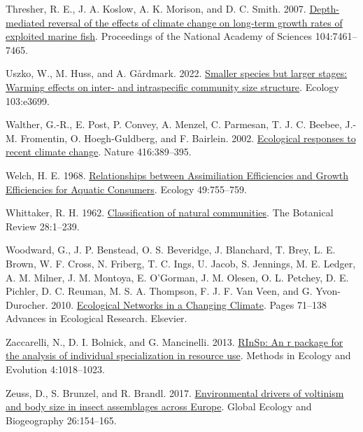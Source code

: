 \documentclass[
]{article}
\newlength{\cslhangindent}
\newlength{\cslentryspacingunit} %
\newenvironment{CSLReferences}[2] %
 {%
  \setlength{\parindent}{0pt}
  \ifodd #1
  \let\oldpar\par
  \def\par{\hangindent=\cslhangindent\oldpar}
  \fi
  \setlength{\parskip}{#2\cslentryspacingunit}
 }%
 {}
\numberwithin{equation}
\begin{document}
\begin{CSLReferences}{1}{0}
\leavevmode{}%
Thresher, R. E., J. A. Koslow, A. K. Morison, and D. C. Smith. 2007.
\href{https://doi.org/10.1073/pnas.0610546104}{Depth-mediated reversal
of the effects of climate change on long-term growth rates of exploited
marine fish}. Proceedings of the National Academy of Sciences
104:7461--7465.

\leavevmode{}%
Uszko, W., M. Huss, and A. Gårdmark. 2022.
\href{https://doi.org/10.1002/ecy.3699}{Smaller species but larger
stages: {Warming} effects on inter- and intraspecific community size
structure}. Ecology 103:e3699.

\leavevmode{}%
Walther, G.-R., E. Post, P. Convey, A. Menzel, C. Parmesan, T. J. C.
Beebee, J.-M. Fromentin, O. Hoegh-Guldberg, and F. Bairlein. 2002.
\href{https://doi.org/10.1038/416389a}{Ecological responses to recent
climate change}. Nature 416:389--395.

\leavevmode{}%
Welch, H. E. 1968. \href{https://doi.org/10.2307/1935541}{Relationships
between {Assimiliation Efficiencies} and {Growth Efficiencies} for
{Aquatic Consumers}}. Ecology 49:755--759.

\leavevmode{}%
Whittaker, R. H. 1962.
\href{https://doi.org/10.1007/BF02860872}{Classification of natural
communities}. The Botanical Review 28:1--239.

\leavevmode{}%
Woodward, G., J. P. Benstead, O. S. Beveridge, J. Blanchard, T. Brey, L.
E. Brown, W. F. Cross, N. Friberg, T. C. Ings, U. Jacob, S. Jennings, M.
E. Ledger, A. M. Milner, J. M. Montoya, E. O'Gorman, J. M. Olesen, O. L.
Petchey, D. E. Pichler, D. C. Reuman, M. S. A. Thompson, F. J. F. Van
Veen, and G. Yvon-Durocher. 2010.
\href{https://doi.org/10.1016/B978-0-12-381363-3.00002-2}{Ecological
{Networks} in a {Changing Climate}}. Pages 71--138 Advances in
{Ecological Research}. Elsevier.

\leavevmode{}%
Zaccarelli, N., D. I. Bolnick, and G. Mancinelli. 2013.
\href{https://doi.org/10.1111/2041-210X.12079}{{RInSp}: An r package for
the analysis of individual specialization in resource use}. Methods in
Ecology and Evolution 4:1018--1023.

\leavevmode{}%
Zeuss, D., S. Brunzel, and R. Brandl. 2017.
\href{https://doi.org/10.1111/geb.12525}{Environmental drivers of
voltinism and body size in insect assemblages across {Europe}}. Global
Ecology and Biogeography 26:154--165.


\end{CSLReferences}
\end{document}
